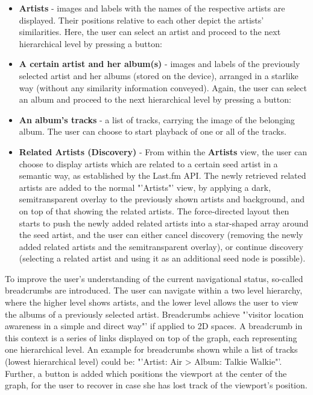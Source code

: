 \begin{itemize}
	\item \textbf{Artists} - images and labels with the names of the respective artists are displayed. Their positions relative to each other depict the artists' similarities. Here, the user can select an artist and proceed to the next hierarchical level by pressing a button:
	\item \textbf{A certain artist and her album(s)} - images and labels of the previously selected artist and her albums (stored on the device), arranged in a starlike way (without any similarity information conveyed). Again, the user can select an album and proceed to the next hierarchical level by pressing a button:
	\item \textbf{An album's tracks} - a list of tracks, carrying the image of the belonging album. The user can choose to start playback of one or all of the tracks.
	\item \textbf{Related Artists (Discovery)} - From within the \textbf{Artists} view, the user can choose to display artists which are related to a certain seed artist in a semantic way, as established by the Last.fm API. The newly retrieved related artists are added to the normal "'Artists"' view, by applying a dark, semitransparent overlay to the previously shown artists and background, and on top of that showing the related artists. The force-directed layout then starts to push the newly added related artists into a star-shaped array around the seed artist, and the user can either cancel discovery (removing the newly added related artists and the semitransparent overlay), or continue discovery (selecting a related artist and using it as an additional seed node is possible).
	
\end{itemize}


To improve the user's understanding of the current navigational status, so-called breadcrumbs are introduced. The user can navigate within a two level hierarchy, where the higher level shows artists, and the lower level allows the user to view the albums of a previously selected artist. Breadcrumbs achieve "'visitor location awareness in a simple and direct way"' \cite{Tesoriero:2008:Breadcrumbs} if applied to 2D spaces. A breadcrumb in this context is a series of links displayed on top of the graph, each representing one hierarchical level. An example for breadcrumbs shown while a list of tracks (lowest hierarchical level) could be: "'Artist: Air > Album: Talkie Walkie"'. Further, a button is added which positions the viewport at the center of the graph, for the user to recover in case she has lost track of the viewport's position.

